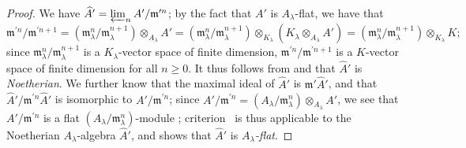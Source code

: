 \begin{proof}
We have $\widehat{A}'=\varprojlim_n A'/\mathfrak{m}^{\prime n}$;
by the fact that $A'$ is $A_\lambda$-flat, we have that
\[
  \mathfrak{m}^{\prime n}/\mathfrak{m}^{\prime n+1}=(\mathfrak{m}_\lambda^{n}/\mathfrak{m}_\lambda^{n+1})\otimes_{A_\lambda}A'=(\mathfrak{m}_\lambda^{n}/\mathfrak{m}_\lambda^{n+1})\otimes_{K_\lambda}(K_\lambda\otimes_{A_\lambda}A')=(\mathfrak{m}_\lambda^{n}/\mathfrak{m}_\lambda^{n+1})\otimes_{K_\lambda}K;
\]
since $\mathfrak{m}_\lambda^{n}/\mathfrak{m}_\lambda^{n+1}$ is a $K_\lambda$-vector space of finite dimension, $\mathfrak{m}^{\prime n}/\mathfrak{m}^{\prime n+1}$ is a $K$-vector space of finite dimension for all $n\geq 0$.
It thus follows from  and  that $\widehat{A}'$ is \emph{Noetherian}.
We further know that the maximal ideal of $\widehat{A}'$ is $\mathfrak{m}'\widehat{A}'$, and that $\widehat{A}'/\mathfrak{m}^{\prime n}\widehat{A}'$ is isomorphic to $A'/\mathfrak{m}^{\prime n}$;
since $A'/\mathfrak{m}^{\prime n}=(A_\lambda/\mathfrak{m}_\lambda^n)\otimes_{A_\lambda}A'$, we see that $A'/\mathfrak{m}^{\prime n}$ is a flat $(A_\lambda/\mathfrak{m}_\lambda^n)$-module ;
criterion~ is thus applicable to the Noetherian $A_\lambda$-algebra $\widehat{A}'$, and shows that $\widehat{A}'$ is \emph{$A_\lambda$-flat}.
\end{proof}

